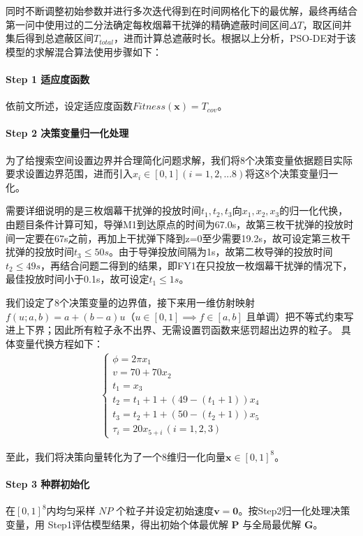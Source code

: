 \documentclass[withoutpreface]{cumcmthesis}
\begin{document}
同时不断调整初始参数并进行多次迭代得到在时间网格化下的最优解，最终再结合第一问中使用过的二分法确定每枚烟幕干扰弹的精确遮蔽时间区间$\Delta T$，取区间并集后得到总遮蔽区间$T_{total}$，进而计算总遮蔽时长。根据以上分析，PSO-DE对于该模型的求解混合算法使用步骤如下：
\paragraph{Step 1 适应度函数}
依前文所述，设定适应度函数$Fitness(\mathbf{x})=T_{cov}$。
\paragraph{Step 2 决策变量归一化处理}
为了给搜索空间设置边界并合理简化问题求解，我们将8个决策变量依据题目实际要求设置边界范围，进而引入$x_i\in [0,1](i=1,2,...8)$将这8个决策变量归一化。

需要详细说明的是三枚烟幕干扰弹的投放时间$t_1,t_2,t_3$向$x_1,x_2,x_3$的归一化代换，由题目条件计算可知，导弹M1到达原点的时间为67.0s，故第三枚干扰弹的投放时间一定要在67s之前，再加上干扰弹下降到z=0至少需要19.2s，故可设定第三枚干扰弹的投放时间$t_3\leq 50s$。由于导弹投放间隔为1s，故第二枚导弹的投放时间$t_2\leq 49s$，再结合问题二得到的结果，即FY1在只投放一枚烟幕干扰弹的情况下，最佳投放时间小于0.1s，故可设定$t_1\leq 1s$。

我们设定了8个决策变量的边界值，接下来用一维仿射映射 $f(u; a, b) = a + (b - a)u$（$u \in [0,1] \implies f \in [a, b]$ 且单调）把不等式约束写进上下界；因此所有粒子永不出界、无需设置罚函数来惩罚超出边界的粒子。
具体变量代换方程如下：
\begin{equation}
    \begin{aligned}
        \begin{cases}
            \phi  = 2\pi x_1 \\
    v = 70 + 70 x_2 \\
    t_1 = x_3\\
    t_2 = t_1 + 1 + (49 - (t_1 + 1))x_4 \\
    t_3 = t_2 + 1 + (50 - (t_2 + 1))x_5 \\
    \tau_i = 20 x_{5+i}\,(i=1,2,3)
        \end{cases}    
\end{aligned}
\end{equation}    

至此，我们将决策向量转化为了一个8维归一化向量$\mathbf{x}\in [0,1]^8$。

\paragraph{Step 3 种群初始化}
在$[0,1]^8$内均匀采样 $NP$ 个粒子并设定初始速度$\mathbf{v}=\mathbf{0}$。按Step2归一化处理决策变量，用 Step1评估模型结果，得出初始个体最优解 $\mathbf{P}$ 与全局最优解 $\mathbf{G}$。
\end{document}
